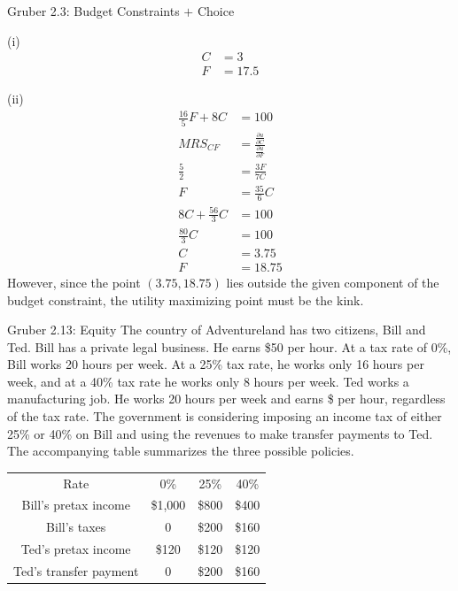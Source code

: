 \documentclass[10pt]{extarticle}
\begin{document}
{\begin{problem}{Gruber 2.3: Budget Constraints $+$ Choice}
\begin{problem}{(i)}
\begin{align*}
        C &= 3\\
        F &= 17.5
      \end{align*}
    \end{problem}
    \begin{problem}{(ii)}
      \begin{align*}
        \frac{16}{5}F + 8C &= 100 \tag*{component of budget constraint}\\
        MRS_{CF} &= \frac{\frac{\partial u}{\partial C}}{\frac{\partial u}{\partial F}} \\
        \frac{5}{2}&= \frac{3F}{7C} \\
        F &= \frac{35}{6}C\\
        8C + \frac{56}{3}C &= 100\\
        \frac{80}{3}C &= 100\\
        C &= 3.75\\
        F &= 18.75
      \end{align*}
      However, since the point $(3.75,18.75)$ lies outside the given component of the budget constraint, the utility maximizing point must be the kink.
    \end{problem}
  \end{problem}
  \begin{problem}{Gruber 2.13: Equity}
    The country of Adventureland has two citizens, Bill and Ted. Bill has a private legal business. He earns \$50 per hour. At a tax rate of 0\%, Bill works 20 hours per week. At a 25\% tax rate, he works only 16 hours per week, and at a 40\% tax rate he works only 8 hours per week. Ted works a manufacturing job. He works 20 hours per week and earns \$ per hour, regardless of the tax rate. The government is considering imposing an income tax of either 25\% or 40\% on Bill and using the revenues to make transfer payments to Ted. The accompanying table summarizes the three possible policies.
    \begin{center}
      \renewcommand{\arraystretch}{1.5}
      \begin{tabular}{c|c|c|c|}
        \cline{2-4}
        Rate & 0\% & 25\% & 40\% \\
        \cline{2-4}
        Bill's pretax income & \$1,000 & \$800 & \$400 \\
        \cline{2-4}
        Bill's taxes & 0 & \$200 & \$160 \\
        \cline{2-4}
        Ted's pretax income & \$120 & \$120 & \$120 \\
        \cline{2-4}
        Ted's transfer payment & 0 & \$200 & \$160\\

\end{tabular}
\end{center}
\end{problem}}
\end{document}
